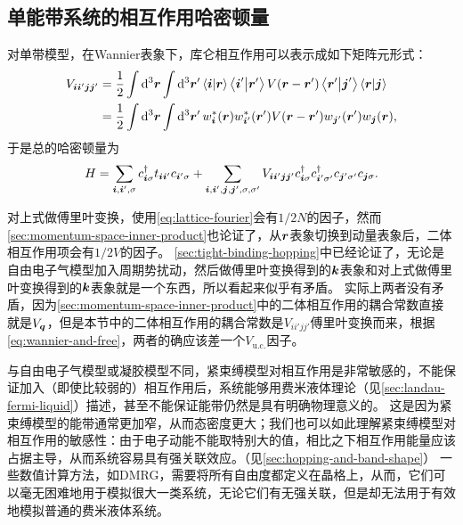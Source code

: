 \subsection{单能带系统的相互作用哈密顿量}

对单带模型，在Wannier表象下，库仑相互作用可以表示成如下矩阵元形式：
\begin{equation}
    \begin{aligned}
        V_{\vb*{i} \vb*{i}' \vb*{j} \vb*{j}'} &= \frac{1}{2} \int \dd[3]{\vb*{r}} \int \dd[3]{\vb*{r}'} \braket{\vb*{i}}{\vb*{r}} \braket{\vb*{i}'}{\vb*{r}'} V(\vb*{r} - \vb*{r}') \braket{\vb*{r}'}{\vb*{j}'} \braket{\vb*{r}}{\vb*{j}} \\
        &= \frac{1}{2} \int \dd[3]{\vb*{r}} \int \dd[3]{\vb*{r}'} w_{\vb*{i}}^*(\vb*{r}) w_{\vb*{i}'}^*(\vb*{r}') V(\vb*{r} - \vb*{r}') w_{\vb*{j}'}(\vb*{r}') w_{\vb*{j}}(\vb*{r}),
    \end{aligned}
    \label{eq:wannier-basis-interaction}
\end{equation}
于是总的哈密顿量为
\begin{equation}
    H = \sum_{\vb*{i}, \vb*{i}', \sigma} c^\dagger_{\vb*{i} \sigma} t_{\vb*{i} \vb*{i}'} c_{\vb*{i}' \sigma} + \sum_{\vb*{i}, \vb*{i}', \vb*{j}, \vb*{j}', \sigma, \sigma'} V_{\vb*{i} \vb*{i}' \vb*{j} \vb*{j}'} c^\dagger_{\vb*{i} \sigma} c^\dagger_{\vb*{i}' \sigma'} c_{\vb*{j}' \sigma'} c_{\vb*{j} \sigma}.
\end{equation}

对上式做傅里叶变换，使用\eqref{eq:lattice-fourier}会有$1/2N$的因子，然而\autoref{sec:momentum-space-inner-product}也论证了，从$\vb*{r}$表象切换到动量表象后，二体相互作用项会有$1/2V$的因子。
\autoref{sec:tight-binding-hopping}中已经论证了，无论是自由电子气模型加入周期势扰动，然后做傅里叶变换得到的$\vb*{k}$表象和对上式做傅里叶变换得到的$\vb*{k}$表象就是一个东西，所以看起来似乎有矛盾。
实际上两者没有矛盾，因为\autoref{sec:momentum-space-inner-product}中的二体相互作用的耦合常数直接就是$V_{\vb*{q}}$，但是本节中的二体相互作用的耦合常数是$V_{i i' j j'}$傅里叶变换而来，根据\eqref{eq:wannier-and-free}，两者的确应该差一个$V_\text{u.c.}$因子。

与自由电子气模型或凝胶模型不同，紧束缚模型对相互作用是非常敏感的，不能保证加入（即使比较弱的）相互作用后，系统能够用费米液体理论（见\autoref{sec:landau-fermi-liquid}）描述，甚至不能保证能带仍然是具有明确物理意义的。
这是因为紧束缚模型的能带通常更加窄，从而态密度更大；我们也可以如此理解紧束缚模型对相互作用的敏感性：由于电子动能不能取特别大的值，相比之下相互作用能量应该占据主导，从而系统容易具有强关联效应。（见\autoref{sec:hopping-and-band-shape}）
一些数值计算方法，如DMRG，需要将所有自由度都定义在晶格上，从而，它们可以毫无困难地用于模拟很大一类系统，无论它们有无强关联，但是却无法用于有效地模拟普通的费米液体系统。


